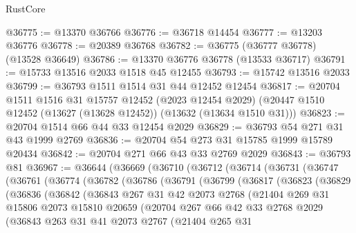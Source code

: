 \begin{lexlean}{RustCore}
\begin{coremodule}
@36775 := @13370 @36766
@36776 := @36718 @14454
@36777 := @13203 @36776
@36778 := @20389 @36768
@36782 := @36775 (@36777 @36778) (@13528 @36649)
@36786 := @13370 @36776 @36778 (@13533 @36717)
@36791 := @15733 @13516 @2033 @1518 @45 @12455
@36793 := @15742 @13516 @2033
@36799 := @36793 @1511 @1514 @31 @44 @12452 @12454
@36817 := @20704
    @1511
    @1516
    @31
    @15757
    @12452
    (@2023 @12454 @2029)
    (@20447 @1510 @12452 (@13627 (@13628 @12452)) (@13632 (@13634 @1510 @31)))
@36823 := @20704 @1514 @66 @44 @33 @12454 @2029
@36829 := @36793 @54 @271 @31 @43 @1999 @2769
@36836 := @20704 @54 @273 @31 @15785 @1999 @15789 @20434
@36842 := @20704 @271 @66 @43 @33 @2769 @2029
@36843 := @36793 @81
@36967 := @36644
    (@36669
      (@36710
        (@36712
          (@36714
            (@36731
              (@36747
                (@36761
                  (@36774
                    (@36782
                      (@36786
                        (@36791
                          (@36799
                            (@36817
                              (@36823
                                (@36829
                                  (@36836
                                    (@36842
                                      (@36843
                                        @267
                                        @31
                                        @42
                                        @2073
                                        @2768
                                        (@21404
                                          @269
                                          @31
                                          @15806
                                          @2073
                                          @15810
                                          @20659
                                          (@20704
                                            @267
                                            @66
                                            @42
                                            @33
                                            @2768
                                            @2029
                                            (@36843
                                              @263
                                              @31
                                              @41
                                              @2073
                                              @2767
                                              (@21404
                                                @265
                                                @31

\end{coremodule}
\end{lexlean}
